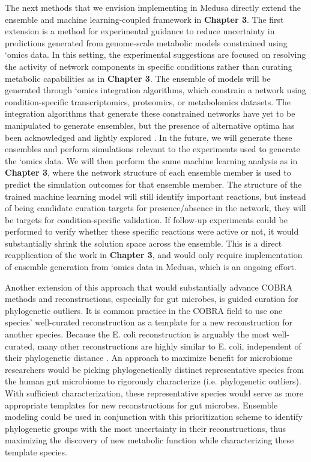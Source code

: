 \documentclass[11pt,twocolumn,notitlepage,openany,twoside]{book}
\begin{document}
\begin{refsection}
The next methods that we envision implementing in Medusa directly extend the ensemble and machine learning-coupled framework in \textbf{Chapter 3}. The first extension is a method for experimental guidance to reduce uncertainty in predictions generated from genome-scale metabolic models constrained using ‘omics data. In this setting, the experimental suggestions are focused on resolving the activity of network components in specific conditions rather than curating metabolic capabilities as in \textbf{Chapter 3}. The ensemble of models will be generated through ‘omics integration algorithms, which constrain a network using condition-specific transcriptomics, proteomics, or metabolomics datasets. The integration algorithms that generate these constrained networks have yet to be manipulated to generate ensembles, but the presence of alternative optima has been acknowledged and lightly explored \cite{Robaina-Estevez2017-fy}. In the future, we will generate these ensembles and perform simulations relevant to the experiments used to generate the ‘omics data. We will then perform the same machine learning analysis as in \textbf{Chapter 3}, where the network structure of each ensemble member is used to predict the simulation outcomes for that ensemble member. The structure of the trained machine learning model will still identify important reactions, but instead of being candidate curation targets for presence/absence in the network, they will be targets for condition-specific validation. If follow-up experiments could be performed to verify whether these specific reactions were active or not, it would substantially shrink the solution space across the ensemble. This is a direct reapplication of the work in \textbf{Chapter 3}, and would only require implementation of ensemble generation from ‘omics data in Medusa, which is an ongoing effort.

Another extension of this approach that would substantially advance COBRA methods and reconstructions, especially for gut microbes, is guided curation for phylogenetic outliers. It is common practice in the COBRA field to use one species’ well-curated reconstruction as a template for a new reconstruction for another species. Because the E. coli reconstruction is arguably the most well-curated, many other reconstructions are highly similar to E. coli, independent of their phylogenetic distance \cite{Monk2014-fa}. An approach to maximize benefit for microbiome researchers would be picking phylogenetically distinct representative species from the human gut microbiome to rigorously characterize (i.e. phylogenetic outliers). With sufficient characterization, these representative species would serve as more appropriate templates for new reconstructions for gut microbes. Ensemble modeling could be used in conjunction with this prioritization scheme to identify phylogenetic groups with the most uncertainty in their reconstructions, thus maximizing the discovery of new metabolic function while characterizing these template species.


\end{refsection}
\end{document}
